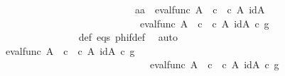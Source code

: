 \begin{isabellebody}
\ \ \ \ \ \ \ \ \ \ \isamarkupfalse%
\ {\isacharminus}{\kern0pt}\ \isanewline
\ \ \ \ \ \ \ \ \ \ \ \ \ \ \isamarkupfalse%
\ {\isachardoublequoteopen}{\isasymlangle}a{}{\isacharcomma}{\kern0pt}a{}{\isasymrangle}\ {\isacharequal}{\kern0pt}\ {\isasymlangle}eval{\isacharunderscore}{\kern0pt}func\ A\ {\isasymOmega}\ {\isasymcirc}\isactrlsub c\ {\isasymlangle}{\isasymt}\ {\isasymcirc}\isactrlsub c\ {\isasymbeta}\isactrlbsub A\isactrlbsup {\isasymOmega}\isactrlesup \isactrlesub {\isacharcomma}{\kern0pt}\ id{\isacharparenleft}{\kern0pt}A\isactrlbsup {\isasymOmega}\isactrlesup {\isacharparenright}{\kern0pt}{\isasymrangle}{\isacharcomma}{\kern0pt}\isanewline
\ \ \ \ \ \ \ \ \ \ \ \ \ \ \ \ \ \ \ \ \ \ \ \ \ \ \ \ \ \ eval{\isacharunderscore}{\kern0pt}func\ A\ {\isasymOmega}\ {\isasymcirc}\isactrlsub c\ {\isasymlangle}{\isasymf}\ {\isasymcirc}\isactrlsub c\ {\isasymbeta}\isactrlbsub A\isactrlbsup {\isasymOmega}\isactrlesup \isactrlesub {\isacharcomma}{\kern0pt}\ id{\isacharparenleft}{\kern0pt}A\isactrlbsup {\isasymOmega}\isactrlesup {\isacharparenright}{\kern0pt}{\isasymrangle}{\isasymrangle}\ {\isasymcirc}\isactrlsub c\ g{\isachardoublequoteclose}\isanewline
\ \ \ \ \ \ \ \ \ \ \ \ \ \ \ \ \isamarkupfalse%
\ {\isasymphi}{\isacharunderscore}{\kern0pt}def\ eqs\ phi{\isacharunderscore}{\kern0pt}f{\isacharunderscore}{\kern0pt}def\ \isamarkupfalse%
\ auto\isanewline
\ \ \ \ \ \ \ \ \ \ \ \ \ \ \isamarkupfalse%
\ \isamarkupfalse%
\ {\isachardoublequoteopen}{\isachardot}{\kern0pt}{\isachardot}{\kern0pt}{\isachardot}{\kern0pt}\ {\isacharequal}{\kern0pt}\ {\isasymlangle}eval{\isacharunderscore}{\kern0pt}func\ A\ {\isasymOmega}\ {\isasymcirc}\isactrlsub c\ {\isasymlangle}{\isasymt}\ {\isasymcirc}\isactrlsub c\ {\isasymbeta}\isactrlbsub A\isactrlbsup {\isasymOmega}\isactrlesup \isactrlesub {\isacharcomma}{\kern0pt}\ id{\isacharparenleft}{\kern0pt}A\isactrlbsup {\isasymOmega}\isactrlesup {\isacharparenright}{\kern0pt}{\isasymrangle}\ {\isasymcirc}\isactrlsub c\ g\ {\isacharcomma}{\kern0pt}\isanewline
\ \ \ \ \ \ \ \ \ \ \ \ \ \ \ \ \ \ \ \ \ \ \ \ \ \ \ \ \ \ \ \ eval{\isacharunderscore}{\kern0pt}func\ A\ {\isasymOmega}\ {\isasymcirc}\isactrlsub c\ {\isasymlangle}{\isasymf}\ {\isasymcirc}\isactrlsub c\ {\isasymbeta}\isactrlbsub A\isactrlbsup {\isasymOmega}\isactrlesup \isactrlesub {\isacharcomma}{\kern0pt}\ id{\isacharparenleft}{\kern0pt}A\isactrlbsup {\isasymOmega}\isactrlesup {\isacharparenright}{\kern0pt}{\isasymrangle}\ {\isasymcirc}\isactrlsub c\ g{\isasymrangle}{\isachardoublequoteclose}\isanewline

\end{isabellebody}
